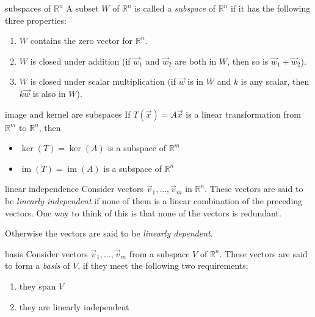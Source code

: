 \documentclass[avery5371,grid,letterpaper]{flashcards}
\newcommand{\Rn}{\mathbb{R}^{n}}
\newcommand{\Rm}{\mathbb{R}^{m}}
\DeclareMathOperator{\im}{im}
\begin{document}
\begin{flashcard}[Definition]{subspaces of $\Rn$}
A subset $W$ of $\Rn$ is called a \textit{subspace} of $\Rn$ if it has
the following three properties:
\begin{enumerate}
\item $W$ contains the zero vector for $\Rn$.
\item $W$ is closed under addition (if $\vec{w}_1$ and $\vec{w}_2$
are both in $W$, then so is $\vec{w}_1 + \vec{w}_2$).
\item $W$ is closed under scalar multiplication (if $\vec{w}$ is in $W$ and $k$ is any scalar, then $k\vec{w}$ is also in $W$).
\end{enumerate}
\end{flashcard}

\begin{flashcard}[Theorem]{image and kernel are subspaces}
If $T(\vec{x}) = A\vec{x}$ is a linear transformation from $\Rm$ to $\Rn$, then
\begin{itemize}
\item $\ker(T)= \ker(A)$ is a subspace of $\Rm$
\item $\im(T) = \im(A)$ is a subspace of $\Rn$
\end{itemize}
\end{flashcard}

\begin{flashcard}[Definition]{linear independence}
Consider vectors $\vec{v}_1, \ldots, \vec{v}_m$ in $\Rn$.  These vectors are
said to be \textit{linearly independent} if none of them is a linear combination
of the preceding vectors.  One way to think of this is that none of the vectors
is redundant.

\medskip
Otherwise the vectors are said to be \textit{linearly dependent}.
\end{flashcard}

\begin{flashcard}[Definition]{basis}
Consider vectors $\vec{v}_1, \ldots, \vec{v}_m$ from a subspace $V$ of
$\Rn$.  These vectors are said to form a \textit{basis} of $V$, if they
meet the following two requirements:
\begin{enumerate}
\item they span $V$
\item they are linearly independent
\end{enumerate}
\end{flashcard}
\end{document}
